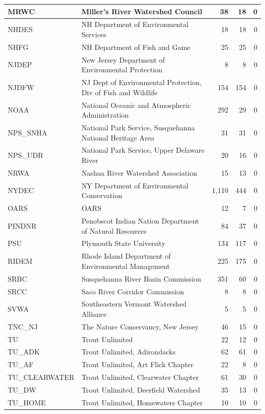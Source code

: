 \documentclass[
]{book}
\begin{document}
\begin{tabular}{l|l|r|r|r}
\hline
MRWC & Miller's River Watershed Council & 38 & 18 & 0\\
\hline
NHDES & NH Department of Environmental Services & 18 & 18 & 0\\
\hline
NHFG & NH Department of Fish and Game & 25 & 25 & 0\\
\hline
NJDEP & New Jersey Department of Environmental Protection & 8 & 8 & 0\\
\hline
NJDFW & NJ Dept of Environmental Protection, Div of Fish and Wildlife & 154 & 154 & 0\\
\hline
NOAA & National Oceanic and Atmospheric Administration & 292 & 29 & 0\\
\hline
NPS\_SNHA & National Park Service, Susquehanna National Heritage Area & 31 & 31 & 0\\
\hline
NPS\_UDR & National Park Service, Upper Delaware River & 20 & 16 & 0\\
\hline
NRWA & Nashua River Watershed Association & 15 & 13 & 0\\
\hline
NYDEC & NY Department of Environmental Conservation & 1,110 & 444 & 0\\
\hline
OARS & OARS & 12 & 7 & 0\\
\hline
PINDNR & Penobscot Indian Nation Department of Natural Resources & 84 & 37 & 0\\
\hline
PSU & Plymouth State University & 134 & 117 & 0\\
\hline
RIDEM & Rhode Island Department of Environmental Management & 225 & 175 & 0\\
\hline
SRBC & Susquehanna River Basin Commission & 351 & 60 & 0\\
\hline
SRCC & Saco River Corridor Commission & 8 & 8 & 0\\
\hline
SVWA & Southeastern Vermont Watershed Alliance & 5 & 5 & 0\\
\hline
TNC\_NJ & The Nature Conservancy, New Jersey & 46 & 15 & 0\\
\hline
TU & Trout Unlimited & 22 & 12 & 0\\
\hline
TU\_ADK & Trout Unlimited, Adirondacks & 62 & 61 & 0\\
\hline
TU\_AF & Trout Unlimited, Art Flick Chapter & 22 & 8 & 0\\
\hline
TU\_CLEARWATER & Trout Unlimited, Clearwater Chapter & 61 & 30 & 0\\
\hline
TU\_DW & Trout Unlimited, Deerfield Watershed & 35 & 13 & 0\\
\hline
TU\_HOME & Trout Unlimited, Homewaters Chapter & 10 & 10 & 0\\

\end{tabular}
\end{document}
